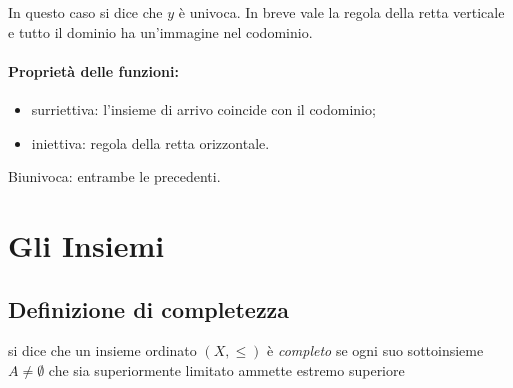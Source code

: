 \documentclass{article}
\begin{document}
\begin{itemize}
\begin{enumerate}
\end{enumerate}

In questo caso si dice che $y $ è univoca. In breve vale la regola della retta verticale e tutto il dominio ha un'immagine nel codominio.

\paragraph{Proprietà delle funzioni:}
\begin{itemize}
	\item surriettiva: l'insieme di arrivo coincide con il codominio;
	\item iniettiva: regola della retta orizzontale.
\end{itemize}

Biunivoca: entrambe le precedenti.

\end{itemize}

\section{Gli Insiemi}

\subsection{Definizione di completezza} si dice che un insieme ordinato $(X, \leq)$ è \textit{completo} se ogni suo sottoinsieme $A \neq \emptyset $ che sia superiormente limitato ammette estremo superiore

\newtheorem{dimostrazione}{Dimostrazione}[section]
\end{document}

